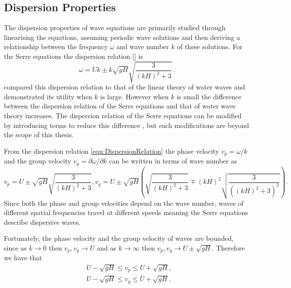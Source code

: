 \subsection{Dispersion Properties}
The dispersion properties of wave equations are primarily studied through linearising the equations, assuming periodic wave solutions and then deriving a relationship between the frequency $\omega$ and wave number $k$ of these solutions. For the Serre equations the dispersion relation [] is
\begin{equation}
\label{eqn:DispersionRelation}
\omega = Uk \pm k \sqrt{gH} \sqrt{\frac{3}{\left(kH\right)^2 + 3}}.
\end{equation}
\citet{Barthelemy-2004-315} compared this dispersion relation to that of the linear theory of water waves and demonstrated its utility when $k$ is large. However when $k$ is small the difference between the dispersion relation of the Serre equations and that of water wave theory increases. The dispersion relation of the Serre equations can be modified by introducing terms to reduce this difference \cite{Barthelemy-2004-315}, but such modifications are beyond the scope of this thesis.


From the dispersion relation \eqref{eqn:DispersionRelation} the phase velocity $v_p = \omega / k$  and the group velocity $v_g = \partial \omega / \partial  k$ can be written in terms of wave number as
\begin{subequations}
	\label{eqn:WaveVelocities}
	\begin{equation}
	\label{eqn:WaveVelocitiesPhase}
	v_p = U \pm \sqrt{gH}\sqrt{\frac{3}{\left(kH\right)^2 + 3}},
	\end{equation}
	\begin{equation}
	\label{eqn:WaveVelocitiesGroup}
	v_g = U \pm \sqrt{gH} \left(\sqrt{\frac{3}{\left(kH\right)^2 + 3}} \mp \left(kH\right)^2 \sqrt{\frac{3}{\left(\left(kH\right)^2 + 3 \right)^3}}\right).
	\end{equation}
\end{subequations}
Since both the phase and group velocities depend on the wave number, waves of different spatial frequencies travel at different speeds meaning the Serre equations describe dispersive waves.

Fortunately, the phase velocity and the group velocity of waves are bounded, since as $k \rightarrow 0$ then $v_p,v_g \rightarrow U$ and as $k \rightarrow \infty$ then $v_p,v_g \rightarrow U \pm \sqrt{gH}$. Therefore we have that
\begin{subequations}
\begin{align}
&U - \sqrt{gH} \le v_p \le U + \sqrt{gH}, \label{eqn:WaveVelocitiesBound} \\
&U - \sqrt{gH} \le v_g \le U + \sqrt{gH}.
\end{align}
\end{subequations}

